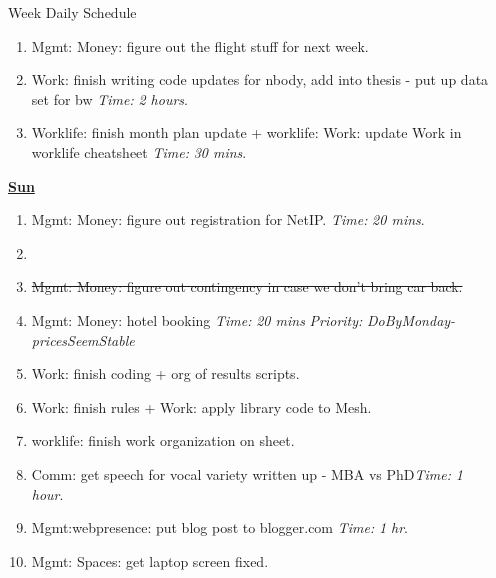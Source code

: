 \documentclass[serif, mathserif, final]{beamer}
\newcommand{\doneTask}[1]{\item \sout{#1}}
\newcommand{\timeEst}[1]{\textit{Time:} \textit{#1}}
\newcommand{\priority}[1]{\textit{Priority:} \textit{#1}}
\begin{document}
\begin{frame}{}
\begin{columns}
\begin{column}{0.50\linewidth}
\begin{block}{Week Daily Schedule}
\begin{enumerate}
\item \tiny Mgmt: Money: figure out the flight stuff for next week. 

\item \tiny Work: finish writing code updates for nbody, add into thesis - put up data set for bw \timeEst{2 hours}. 

\item \tiny Worklife: finish month plan update +  worklife: Work: update Work in worklife cheatsheet \timeEst{30 mins}. 

\end{enumerate} 

\textbf{\small \underline{Sun}}
\begin{enumerate} 
\item \tiny Mgmt: Money: figure out registration for NetIP. \timeEst{20 mins}. 

\item \tiny \doneTask{Mgmt: Money: figure out contingency in case we don't bring car back. }
\item \tiny Mgmt: Money: hotel booking \timeEst{20 mins} \priority{DoByMonday-pricesSeemStable} 

\item \tiny Work: finish coding + org of results scripts. 
\item \tiny Work: finish rules  +  Work: apply library code to Mesh. 
\item \tiny worklife: finish work organization on sheet. 

\item \tiny Comm: get speech for vocal variety written up - MBA vs PhD\timeEst{1 hour}. 
\item \tiny Mgmt:webpresence: put blog post to blogger.com \timeEst{1 hr}.  
\item \tiny Mgmt: Spaces: get laptop screen fixed. 

\end{enumerate} 
\end{block} 


\end{column}%

\begin{column}{0.20\linewidth} 


\end{column}
\end{columns}
\end{frame}
\end{document}
